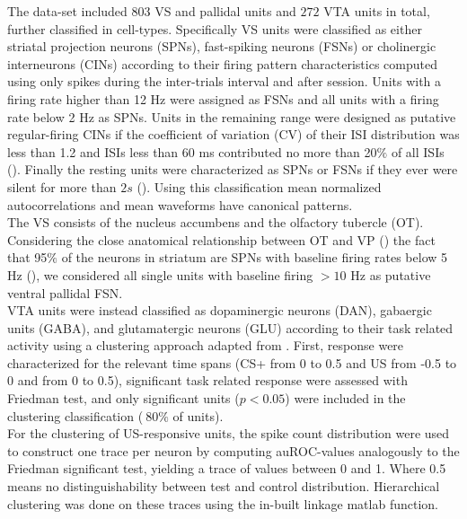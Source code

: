 The data-set included $803$ VS and pallidal units and $272$ VTA units in total, further classified in cell-types. Specifically VS units were classified as either striatal projection neurons (SPNs), fast-spiking neurons (FSNs) or cholinergic interneurons (CINs) according to their firing pattern characteristics computed using only spikes during the inter-trials interval and after session. Units with a firing rate higher than 12 Hz were assigned as FSNs and all units with a firing rate below 2 Hz as SPNs. Units in the remaining range were designed as putative regular-firing CINs if the coefficient of variation (CV) of their ISI distribution was less than 1.2 and ISIs less than 60 ms contributed no more than 20$\%$ of all ISIs (\cite{Inokawa}). Finally the resting units were characterized as SPNs or FSNs if they ever were silent for more than $2s$ (\cite{Graybiel}). Using this classification mean normalized autocorrelations and mean waveforms have canonical patterns.\\The VS consists of the nucleus accumbens and the olfactory tubercle (OT). Considering the close anatomical relationship between OT and VP (\cite{Heimer1982}) the fact that 95$\%$ of the neurons in striatum are SPNs with baseline firing rates below 5 Hz (\cite{Kravitz}), we considered all single units with baseline firing $> 10$ Hz as putative ventral pallidal FSN.\\
VTA units were instead classified as dopaminergic neurons (DAN), gabaergic units (GABA), and glutamatergic neurons (GLU) according to their task related activity using a clustering approach adapted from \cite{Uchida}. First, response were characterized for the relevant time spans (CS+ from 0 to 0.5 and US from -0.5 to 0 and from 0 to 0.5), significant task related response were assessed with Friedman test, and only significant units ($p<0.05$) were included in the clustering classification ($~80\%$ of units).\\For the clustering of US-responsive units, the spike count distribution were used to construct one trace per neuron by computing auROC-values analogously to the Friedman significant test, yielding a trace of values between 0 and 1. Where 0.5 means no distinguishability between test and control distribution. Hierarchical clustering was done on these traces using the in-built linkage matlab function.
